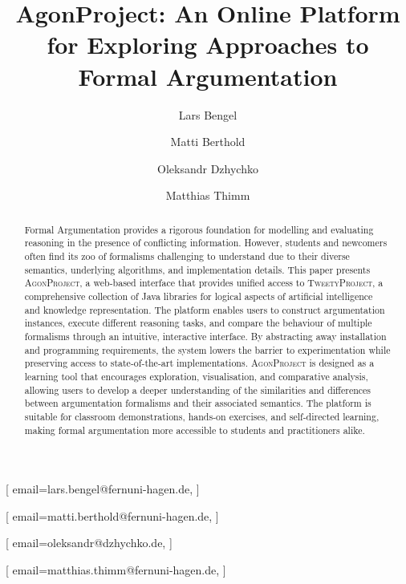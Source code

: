 \documentclass[
]{ceurart}
\newcommand{\agon}{\textsc{AgonProject}\xspace}
\newcommand{\tweety}{\textsc{TweetyProject}\xspace}
\begin{document}


\title{AgonProject: An Online Platform for Exploring Approaches to Formal Argumentation}

\author[]{Lars Bengel}[%
email=lars.bengel@fernuni-hagen.de,
]
\cormark[1]

\author[]{Matti Berthold}[%
email=matti.berthold@fernuni-hagen.de,
]

\author[]{Oleksandr Dzhychko}[%
email=oleksandr@dzhychko.de,
]

\address[]{Artificial Intelligence Group, University of Hagen, Germany}

\author[]{Matthias Thimm}[%
email=matthias.thimm@fernuni-hagen.de,
]


\begin{abstract}
Formal Argumentation provides a rigorous foundation for modelling and evaluating reasoning in the presence of conflicting information. However, students and newcomers often find its zoo of formalisms challenging to understand due to their diverse semantics, underlying algorithms, and implementation details. This paper presents \agon, a web-based interface that provides unified access to \tweety, a comprehensive collection of Java libraries for logical aspects of artificial intelligence and knowledge representation. The platform enables users to construct argumentation instances, execute different reasoning tasks, and compare the behaviour of multiple formalisms through an intuitive, interactive interface. By abstracting away installation and programming requirements, the system lowers the barrier to experimentation while preserving access to state-of-the-art implementations. \agon is designed as a learning tool that encourages exploration, visualisation, and comparative analysis, allowing users to develop a deeper understanding of the similarities and differences between argumentation formalisms and their associated semantics. The platform is suitable for classroom demonstrations, hands-on exercises, and self-directed learning, making formal argumentation more accessible to students and practitioners alike.
\end{abstract}
\end{document}
